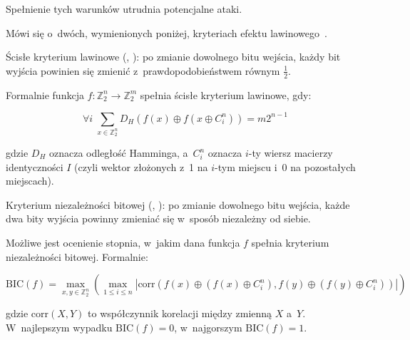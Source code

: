 Spełnienie tych warunków utrudnia potencjalne ataki.

\noindent Mówi się o~dwóch, wymienionych poniżej, kryteriach efektu
lawinowego~\cite{avalanche_criterion1,avalanche_criterion2}.

\begin{myenumerate}

    \item Ścisłe kryterium lawinowe (,
    ): po zmianie dowolnego bitu wejścia, każdy bit wyjścia powinien
    się zmienić z~prawdopodobieństwem równym $\frac{1}{2}$.

    Formalnie funkcja $f : \mathbb{Z}_2^n \to \mathbb{Z}_2^m$ spełnia ścisłe
    kryterium lawinowe, gdy:

    $$\forall i \; \sum_{x \in \mathbb{Z}_2^n} D_H(f(x) \oplus f(x \oplus
    C_i^n)) = m 2^{n-1}$$

    gdzie $D_H$ oznacza odległość Hamminga, a~$C_i^n$ oznacza $i$-ty wiersz
    macierzy identyczności $I$ (czyli wektor złożonych z~1 na $i$-tym miejscu
    i~0 na pozostałych miejscach).

    \item Kryterium niezależności bitowej (,
    ): po zmianie dowolnego bitu wejścia, każde dwa bity wyjścia
    powinny zmieniać się w~sposób niezależny od siebie.

    Możliwe jest ocenienie stopnia, w~jakim dana funkcja $f$ spełnia kryterium
    niezależności bitowej. Formalnie:

    $$\textrm{BIC}(f) = \max_{x, y \in \mathbb{Z}_2^n} \left( \max_{1 \leq i
    \leq n} |\textrm{corr}(f(x) \oplus (f(x) \oplus C_i^n), f(y) \oplus (f(y)
    \oplus C_i^n))| \right)$$

    gdzie $\textrm{corr}(X,Y)$ to współczynnik korelacji między zmienną $X$
    a~$Y$. W~najlepszym wypadku $\textrm{BIC}(f) = 0$, w~najgorszym
    $\textrm{BIC}(f) = 1$.

\end{myenumerate}

